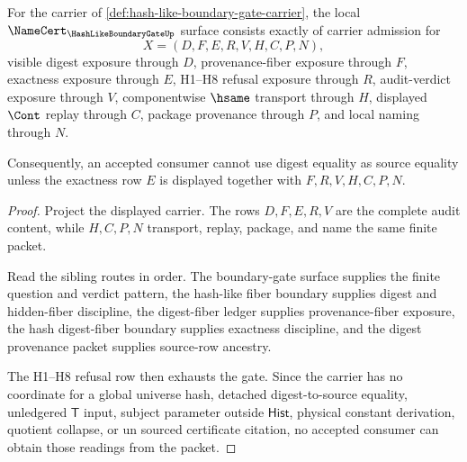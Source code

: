 \begin{theorem}
\label{thm:hash-like-boundary-gate-namecert-obligations}
For the carrier of \autoref{def:hash-like-boundary-gate-carrier}, the local $\NameCert_{\HashLikeBoundaryGateUp}$ surface consists exactly of carrier admission for
$$
X=(D,F,E,R,V,H,C,P,N),
$$
visible digest exposure through $D$, provenance-fiber exposure through $F$, exactness exposure through $E$, H1--H8 refusal exposure through $R$, audit-verdict exposure through $V$, componentwise $\hsame$ transport through $H$, displayed $\Cont$ replay through $C$, package provenance through $P$, and local naming through $N$.

Consequently, an accepted consumer cannot use digest equality as source equality unless the exactness row $E$ is displayed together with $F,R,V,H,C,P,N$.
\end{theorem}
\begin{proof}
Project the displayed carrier. The rows $D,F,E,R,V$ are the complete audit content, while $H,C,P,N$ transport, replay, package, and name the same finite packet.

Read the sibling routes in order. The boundary-gate surface supplies the finite question and verdict pattern, the hash-like fiber boundary supplies digest and hidden-fiber discipline, the digest-fiber ledger supplies provenance-fiber exposure, the hash digest-fiber boundary supplies exactness discipline, and the digest provenance packet supplies source-row ancestry.

The H1--H8 refusal row then exhausts the gate. Since the carrier has no coordinate for a global universe hash, detached digest-to-source equality, unledgered $\mathsf{T}$ input, subject parameter outside $\mathsf{Hist}$, physical constant derivation, quotient collapse, or un sourced certificate citation, no accepted consumer can obtain those readings from the packet.
\end{proof}

